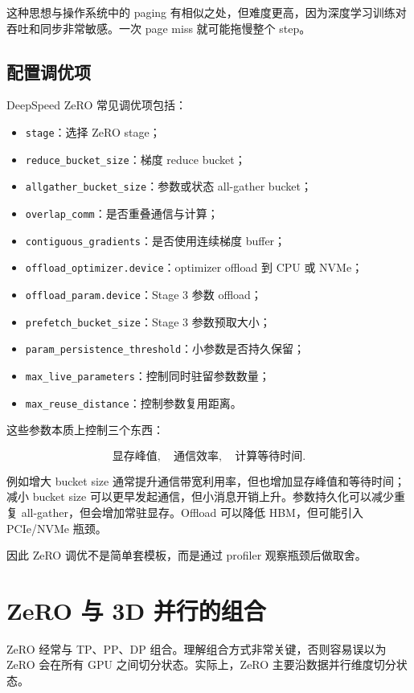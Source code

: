 这种思想与操作系统中的 paging 有相似之处，但难度更高，因为深度学习训练对吞吐和同步非常敏感。一次 page miss 就可能拖慢整个 step。

\subsection{配置调优项}
\label{subsec:deepspeed-tuning-knobs}

DeepSpeed ZeRO 常见调优项包括：

\begin{itemize}
\item \texttt{stage}：选择 ZeRO stage；
\item \texttt{reduce_bucket_size}：梯度 reduce bucket；
\item \texttt{allgather_bucket_size}：参数或状态 all-gather bucket；
\item \texttt{overlap_comm}：是否重叠通信与计算；
\item \texttt{contiguous_gradients}：是否使用连续梯度 buffer；
\item \texttt{offload_optimizer.device}：optimizer offload 到 CPU 或 NVMe；
\item \texttt{offload_param.device}：Stage 3 参数 offload；
\item \texttt{prefetch_bucket_size}：Stage 3 参数预取大小；
\item \texttt{param_persistence_threshold}：小参数是否持久保留；
\item \texttt{max_live_parameters}：控制同时驻留参数数量；
\item \texttt{max_reuse_distance}：控制参数复用距离。
\end{itemize}

这些参数本质上控制三个东西：

\[
\text{显存峰值},
\quad
\text{通信效率},
\quad
\text{计算等待时间}.
\]

例如增大 bucket size 通常提升通信带宽利用率，但也增加显存峰值和等待时间；减小 bucket size 可以更早发起通信，但小消息开销上升。参数持久化可以减少重复 all-gather，但会增加常驻显存。Offload 可以降低 HBM，但可能引入 PCIe/NVMe 瓶颈。

因此 ZeRO 调优不是简单套模板，而是通过 profiler 观察瓶颈后做取舍。

\section{ZeRO 与 3D 并行的组合}
\label{sec:zero-with-3d-parallelism}

ZeRO 经常与 TP、PP、DP 组合。理解组合方式非常关键，否则容易误以为 ZeRO 会在所有 GPU 之间切分状态。实际上，ZeRO 主要沿数据并行维度切分状态。

